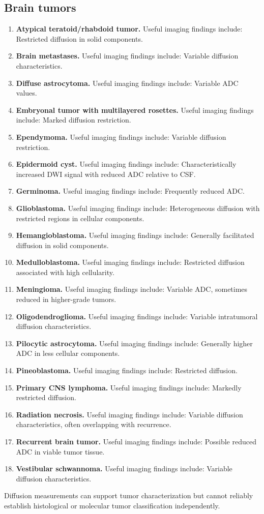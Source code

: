 \subsection{Brain tumors}
\begin{enumerate}[leftmargin=*,itemsep=0.45em,topsep=0.4em]
\item \textbf{Atypical teratoid/rhabdoid tumor.} Useful imaging findings include: Restricted diffusion in solid components.
\item \textbf{Brain metastases.} Useful imaging findings include: Variable diffusion characteristics.
\item \textbf{Diffuse astrocytoma.} Useful imaging findings include: Variable ADC values.
\item \textbf{Embryonal tumor with multilayered rosettes.} Useful imaging findings include: Marked diffusion restriction.
\item \textbf{Ependymoma.} Useful imaging findings include: Variable diffusion restriction.
\item \textbf{Epidermoid cyst.} Useful imaging findings include: Characteristically increased DWI signal with reduced ADC relative to CSF.
\item \textbf{Germinoma.} Useful imaging findings include: Frequently reduced ADC.
\item \textbf{Glioblastoma.} Useful imaging findings include: Heterogeneous diffusion with restricted regions in cellular components.
\item \textbf{Hemangioblastoma.} Useful imaging findings include: Generally facilitated diffusion in solid components.
\item \textbf{Medulloblastoma.} Useful imaging findings include: Restricted diffusion associated with high cellularity.
\item \textbf{Meningioma.} Useful imaging findings include: Variable ADC, sometimes reduced in higher-grade tumors.
\item \textbf{Oligodendroglioma.} Useful imaging findings include: Variable intratumoral diffusion characteristics.
\item \textbf{Pilocytic astrocytoma.} Useful imaging findings include: Generally higher ADC in less cellular components.
\item \textbf{Pineoblastoma.} Useful imaging findings include: Restricted diffusion.
\item \textbf{Primary CNS lymphoma.} Useful imaging findings include: Markedly restricted diffusion.
\item \textbf{Radiation necrosis.} Useful imaging findings include: Variable diffusion characteristics, often overlapping with recurrence.
\item \textbf{Recurrent brain tumor.} Useful imaging findings include: Possible reduced ADC in viable tumor tissue.
\item \textbf{Vestibular schwannoma.} Useful imaging findings include: Variable diffusion characteristics.
\end{enumerate}
Diffusion measurements can support tumor characterization but cannot reliably establish histological or molecular tumor classification independently.

